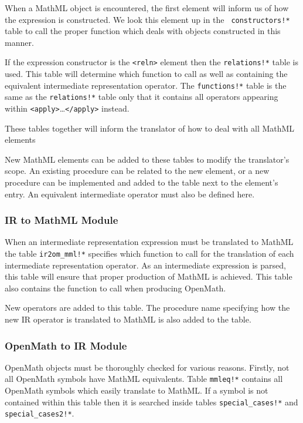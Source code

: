 When a MathML object is encountered, the first element will inform us of how the expression is constructed. We look this element up in the {\tt
constructors!*} table to call the proper function which deals with objects constructed in this manner.

If the expression constructor is the \verb|<reln>| element then the {\tt relations!*} table is used. This table will determine which function to
call as well as containing the equivalent intermediate representation operator. The {\tt functions!*} table is the same as the {\tt relations!*}
table only that it contains all operators appearing within \verb|<apply>|\ldots\verb|</apply>| instead.

These tables together will inform the translator of how to deal with all MathML elements

New MathML elements can be added to these tables to modify the translator's scope. An existing procedure can be related to the new element, or a
new procedure can be implemented and added to the table next to the element's entry. An equivalent intermediate operator must also be defined here.

\subsubsection{IR to MathML Module}

When an intermediate representation expression must be translated to MathML the table {\tt ir2om\_mml!*} specifies which function to call for the
translation of each intermediate representation operator. As an intermediate expression is parsed, this table will ensure that proper production of
MathML is achieved. This table also contains the function to call when producing OpenMath.

New operators are added to this table. The procedure name specifying how the new IR operator is translated to MathML is also added to the table.

\subsubsection{OpenMath to IR Module}

OpenMath objects must be thoroughly checked for various reasons. Firstly, not all OpenMath symbols have MathML equivalents. Table {\tt mmleq!*}
contains all OpenMath symbols which easily translate to MathML. If a symbol is not contained within this table then it is searched inside tables
{\tt special\_cases!*} and {\tt special\_cases2!*}.

